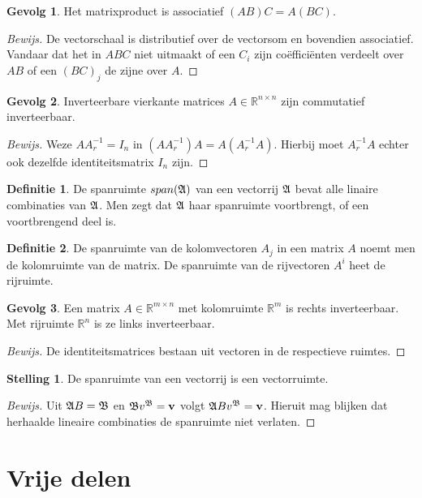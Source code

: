 \documentclass{amsart}
\theoremstyle{definition}
\newtheorem{thm}{Stelling}[section]
\newtheorem{dfn}{Definitie}[section]
\newtheorem{csq}{Gevolg}[section]
\newenvironment{bewijs}{\begin{proof}[Bewijs]}{\end{proof}}
\newcommand{\realnums}{\mathbb{R}}
\newcommand{\realn}[1][n]{\realnums^{#1}}
\newcommand{\realmx}[2][n]{\realn[#2 \times #1]}
\newcommand{\realnxn}{\realmx{n}}
\newcommand{\realmxn}{\realmx{m}}
\newcommand{\vvec}[1][v]{\mathbf{#1}}
\newcommand{\vecrow}[1][a]{\mathfrak{\MakeUppercase{#1}}}
\begin{document}
\begin{csq}
	Het matrixproduct is associatief $(AB)C = A(BC)$.
	\begin{bewijs}
		De vectorschaal is distributief over de vectorsom en bovendien associatief.
		Vandaar dat het in $ABC$ niet uitmaakt of een $C_i$ zijn coëfficiënten verdeelt over $AB$ of een $(BC)_j$ de zijne over $A$.
	\end{bewijs}
\end{csq}

\begin{csq}
	Inverteerbare vierkante matrices $A \in \realnxn$ zijn commutatief inverteerbaar.
	\begin{bewijs}
		Weze $AA^{-1}_r = I_n$ in $(AA^{-1}_r)A = A(A^{-1}_rA)$. Hierbij moet $A^{-1}_rA$ echter ook dezelfde identiteitsmatrix $I_n$ zijn.
	\end{bewijs}
\end{csq}

\begin{dfn}
	De spanruimte $span(\vecrow)$ van een vectorrij $\vecrow$ bevat alle linaire combinaties van $\vecrow$.
	Men zegt dat $\vecrow$ haar spanruimte voortbrengt, of een voortbrengend deel is.
\end{dfn}

\begin{dfn}
	De spanruimte van de kolomvectoren $A_j$ in een matrix $A$ noemt men de kolomruimte van de matrix.
	De spanruimte van de rijvectoren $A^i$ heet de rijruimte.
\end{dfn}

\begin{csq}
	Een matrix $A \in \realmxn$ met kolomruimte $\realn[m]$ is rechts inverteerbaar.
	Met rijruimte $\realn$ is ze links inverteerbaar.
	\begin{bewijs}
		De identiteitsmatrices bestaan uit vectoren in de respectieve ruimtes.
	\end{bewijs}
\end{csq}

\begin{thm}
	De spanruimte van een vectorrij is een vectorruimte.
	\begin{bewijs}
		Uit $\vecrow B = \vecrow[b]$ en $\vecrow[b] v^{\vecrow[b]}= \vvec$ volgt $\vecrow B v^{\vecrow[b]}= \vvec$.
		Hieruit mag blijken dat herhaalde lineaire combinaties de spanruimte niet verlaten.
	\end{bewijs}
\end{thm}

\section{Vrije delen}
\end{document}
